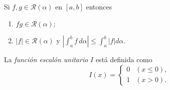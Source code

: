 \documentclass[11pt]{beamer}
\begin{document}
\begin{frame}

\begin{theorem}[9]
Si $f, g \in \mathcal{R}(\alpha)$ en $[a, b]$ entonces
\begin{enumerate}
	\item $fg \in \mathcal{R}(\alpha)$;
	\item $|f| \in \mathcal{R}(\alpha)$ y $\left|\int_a^b f\,d\alpha\right| \leq \int_a^b |f| d\alpha$.
\end{enumerate}
\end{theorem}

\begin{definition}
La \textit{función escalón unitario} $I$ está definida como
\[
	I(x) = \begin{cases}
		0 & (x \leq 0),\\
		1 & (x > 0).
	\end{cases}
\]
\end{definition}

\end{frame}
\end{document}
